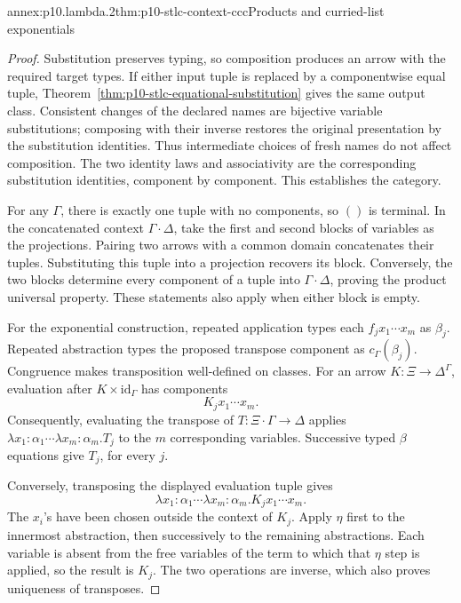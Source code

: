 \begin{annexitem}{annex:p10.lambda.2}{thm:p10-stlc-context-ccc}{Products and curried-list exponentials}
\begin{proof}
Substitution preserves typing, so composition produces an
arrow with the required target types.  If either input tuple
is replaced by a componentwise equal tuple,
Theorem~\ref{thm:p10-stlc-equational-substitution} gives the
same output class.  Consistent changes of the declared names
are bijective variable substitutions; composing with their
inverse restores the original presentation by the substitution
identities.  Thus intermediate choices of fresh names do not
affect composition.  The two identity laws and associativity
are the corresponding substitution identities, component by
component.  This establishes the category.

For any \(\Gamma\), there is exactly one tuple with no
components, so \(()\) is terminal.  In the concatenated
context \(\Gamma\cdot\Delta\), take the first and second
blocks of variables as the projections.  Pairing two arrows
with a common domain concatenates their tuples.
Substituting this tuple into a projection recovers its block.
Conversely, the two blocks determine every component of a
tuple into \(\Gamma\cdot\Delta\), proving the product
universal property.  These statements also apply when
either block is empty.

For the exponential construction, repeated application
types each \(f_jx_1\cdots x_m\) as \(\beta_j\).
Repeated abstraction types the proposed transpose component
as \(c_\Gamma(\beta_j)\).  Congruence makes transposition
well-defined on classes.  For an arrow \(K:\Xi\to\Delta^\Gamma\),
evaluation after \(K\times\mathrm{id}_\Gamma\) has components
\[
                         K_jx_1\cdots x_m.
\]
Consequently, evaluating the transpose of
\(T:\Xi\cdot\Gamma\to\Delta\) applies
\(\lambda x_1{:}\alpha_1\cdots\lambda x_m{:}\alpha_m.T_j\)
to the \(m\) corresponding variables.  Successive typed
\(\beta\) equations give \(T_j\), for every \(j\).

Conversely, transposing the displayed evaluation tuple gives
\[
          \lambda x_1{:}\alpha_1\cdots
                        \lambda x_m{:}\alpha_m.K_jx_1\cdots x_m.
\]
The \(x_i\)'s have been chosen outside the context of \(K_j\).
Apply \(\eta\) first to the innermost abstraction, then
successively to the remaining abstractions.  Each variable
is absent from the free variables of the term to which that
\(\eta\) step is applied, so the result is \(K_j\).
The two operations are inverse, which also proves uniqueness
of transposes.


\end{proof}
\end{annexitem}
